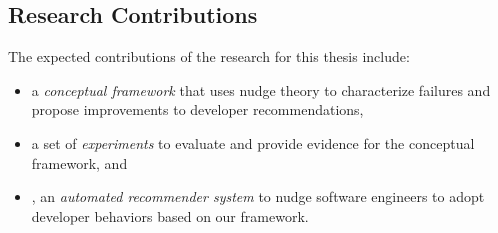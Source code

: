 \subsection{Research Contributions}

The expected contributions of the research for this thesis include:

\begin{itemize}
    \item a \textit{conceptual framework} that uses nudge theory to characterize failures and propose improvements to developer recommendations,
    \item a set of \textit{experiments} to evaluate and provide evidence for the conceptual framework, and
    \item \TOOL, an \textit{automated recommender system} to nudge software engineers to adopt developer behaviors based on our framework.
\end{itemize}

